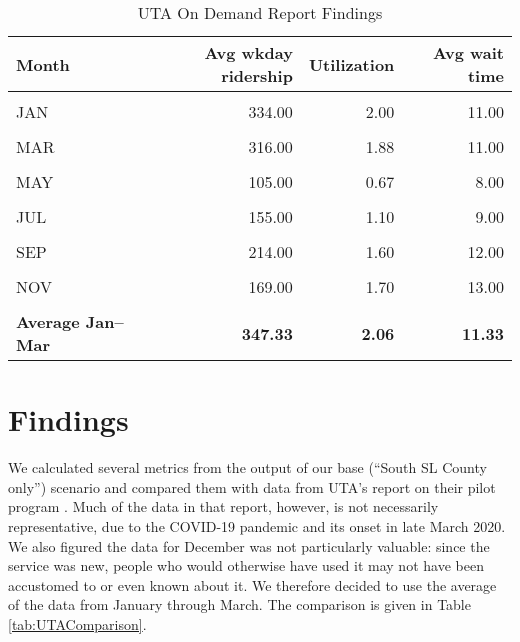 \documentclass[3p, authoryear]{elsarticle} %
\begin{document}
\begin{table}[H]

\caption{\label{tab:UTAOD}UTA On Demand Report Findings}
\centering
\begin{tabular}[t]{lrrr}
\toprule
Month & Avg wkday ridership & Utilization & Avg wait time\\
\midrule
\cellcolor{gray!6}{DEC} & \cellcolor{gray!6}{224.00} & \cellcolor{gray!6}{1.33} & \cellcolor{gray!6}{9.00}\\
JAN & 334.00 & 2.00 & 11.00\\
\cellcolor{gray!6}{FEB} & \cellcolor{gray!6}{392.00} & \cellcolor{gray!6}{2.31} & \cellcolor{gray!6}{12.00}\\
MAR & 316.00 & 1.88 & 11.00\\
\cellcolor{gray!6}{APR} & \cellcolor{gray!6}{275.00} & \cellcolor{gray!6}{1.52} & \cellcolor{gray!6}{10.00}\\
MAY & 105.00 & 0.67 & 8.00\\
\cellcolor{gray!6}{JUN} & \cellcolor{gray!6}{162.00} & \cellcolor{gray!6}{1.10} & \cellcolor{gray!6}{9.00}\\
JUL & 155.00 & 1.10 & 9.00\\
\cellcolor{gray!6}{AUG} & \cellcolor{gray!6}{193.00} & \cellcolor{gray!6}{1.50} & \cellcolor{gray!6}{12.00}\\
SEP & 214.00 & 1.60 & 12.00\\
\cellcolor{gray!6}{OCT} & \cellcolor{gray!6}{200.00} & \cellcolor{gray!6}{1.70} & \cellcolor{gray!6}{13.00}\\
NOV & 169.00 & 1.70 & 13.00\\
\textbf{\cellcolor{gray!6}{Average}} & \textbf{\cellcolor{gray!6}{228.25}} & \textbf{\cellcolor{gray!6}{1.53}} & \textbf{\cellcolor{gray!6}{10.75}}\\
\textbf{Average Jan--Mar} & \textbf{347.33} & \textbf{2.06} & \textbf{11.33}\\
\bottomrule
\end{tabular}
\end{table}

\hypertarget{findings}{%
\section{Findings}\label{findings}}

We calculated several metrics from the output of our base (``South SL County only'') scenario and compared them with data from UTA's report on their pilot program \citep[\citet{UTAevalQ2}, \citet{UTAevalQ3}, \citet{UTAevalQ4}]{UTAevalQ1}. Much of the data in that report, however, is not necessarily representative, due to the COVID-19 pandemic and its onset in late March 2020. We also figured the data for December was not particularly valuable: since the service was new, people who would otherwise have used it may not have been accustomed to or even known about it. We therefore decided to use the average of the data from January through March. The comparison is given in Table \ref{tab:UTAComparison}.
\end{document}
